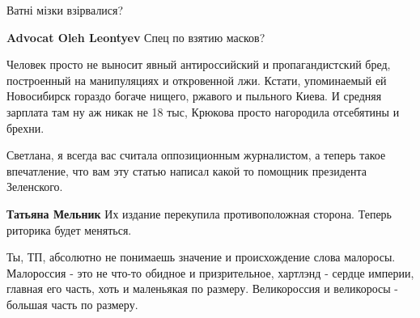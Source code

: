 \begin{itemize}
\begin{itemize}
Ватні мізки взірвалися?

 
\textbf{Advocat Oleh Leontyev} Спец по взятию масков?

 
Человек просто не выносит явный антироссийский и пропагандистский бред,
построенный на манипуляциях и откровенной лжи. Кстати, упоминаемый ей
Новосибирск гораздо богаче нищего, ржавого и пыльного Киева. И средняя зарплата
там ну аж никак не 18 тыс, Крюкова просто нагородила отсебятины и брехни.

\end{itemize}

 

Светлана, я всегда вас считала оппозиционным журналистом, а теперь такое
впечатление, что вам эту статью написал какой то помощник президента
Зеленского.

\begin{itemize}
 
\textbf{Татьяна Мельник} Их издание перекупила противоположная сторона. Теперь риторика будет меняться.
\end{itemize}


Ты, ТП, абсолютно не понимаешь значение и происхождение слова малоросы.
Малороссия - это не что-то обидное и призрительное, хартлэнд - сердце империи,
главная его часть, хоть и маленьякая по размеру. Великороссия и великоросы -
большая часть по размеру.



\end{itemize}
